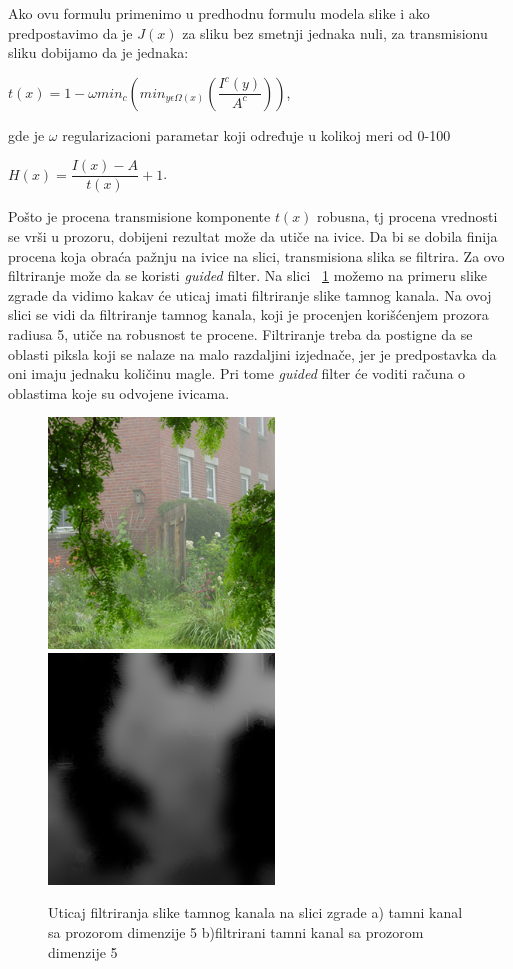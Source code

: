 \documentclass[a4paper,12pt,titlepage]{article}
\begin{document}
Ako ovu formulu primenimo u predhodnu formulu modela slike i ako predpostavimo da je $J(x)$ za sliku bez smetnji jednaka nuli, za transmisionu sliku dobijamo da je jednaka:

\begin{center}
$t(x) = 1 - \omega min_c ( min_{y \epsilon \Omega (x)} (\dfrac{I^c(y)}{A^c}))$,
\end{center}

gde je $\omega$ regularizacioni parametar koji određuje u kolikoj meri od 0-100 %

\begin{center}
$H(x) = \dfrac{I(x) - A}{t(x)} + 1$.
\end{center}

Pošto je procena transmisione komponente $t(x)$ robusna, tj procena vrednosti  se vrši u prozoru, dobijeni rezultat može da utiče na ivice. Da bi se dobila finija procena koja obraća pažnju na ivice na slici, transmisiona slika se filtrira. Za ovo filtriranje može da se koristi \emph{guided} filter. Na slici ~\ref{FiltriraniTamniKanal} možemo na primeru slike zgrade da vidimo kakav će uticaj imati filtriranje slike tamnog kanala. Na ovoj slici se vidi da filtriranje tamnog kanala, koji je procenjen korišćenjem prozora radiusa 5, utiče na robusnost te procene. Filtriranje treba da postigne da se oblasti piksla koji se nalaze na malo razdaljini izjednače, jer je predpostavka da oni imaju jednaku količinu magle. Pri tome \emph{guided} filter će voditi računa o oblastima koje su odvojene ivicama. 

\begin{figure}[ht!]
\centering
\includegraphics[width=60mm]{img/haze.png}
\includegraphics[width=60mm]{img/hazeDC5F.png}
\caption{Uticaj filtriranja slike tamnog kanala na slici zgrade a) tamni kanal sa prozorom dimenzije 5 b)filtrirani tamni kanal sa prozorom dimenzije 5}
\label{FiltriraniTamniKanal}
\end{figure}   
\end{document}
